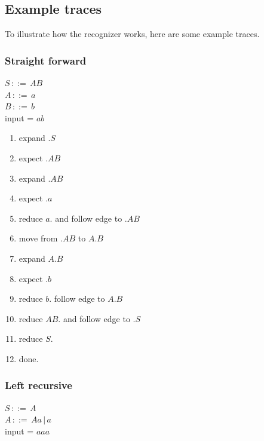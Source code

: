 \documentclass[a4paper,10pt]{article}
\begin{document}
\subsection{Example traces}

To illustrate how the recognizer works, here are some example traces.

\subsubsection{Straight forward}
$S\,::=\,AB$\\
$A\,::=\,a$\\
$B\,::=\,b$\\
input = $ab$

\begin{enumerate}
 \setlength{\itemsep}{0pt}
 \setlength{\parskip}{0pt}
 \setlength{\parsep}{0pt}
 
 \item expand $.S$
 \item expect $.AB$
 \item expand $.AB$
 \item expect $.a$
 \item reduce $a.$ and follow edge to $.AB$
 \item move from $.AB$ to $A.B$
 \item expand $A.B$
 \item expect $.b$
 \item reduce $b.$ follow edge to $A.B$
 \item reduce $AB.$ and follow edge to $.S$
 \item reduce $S.$
 \item done.
\end{enumerate}

\subsubsection{Left recursive}
$S\,::=\,A$\\
$A\,::=\,Aa\,|\,a$\\
input = $aaa$
\end{document}
